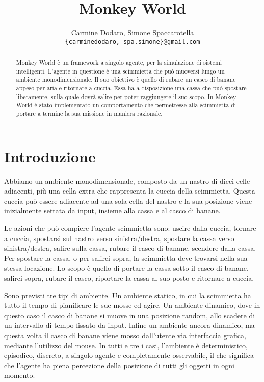 \documentclass[a4paper,10pt]{article}
\title{Monkey World}
\author{
    Carmine Dodaro, Simone Spaccarotella \\
    \texttt{\{carminedodaro, spa.simone\}@gmail.com}
}
\begin{document}
    \maketitle

    \begin{abstract}
	Monkey World è un framework a singolo agente, per la simulazione di sistemi intelligenti. L'agente
	in questione è una scimmietta che può muoversi lungo un ambiente monodimensionale. Il suo obiettivo è quello di rubare un
	casco di banane appeso per aria e ritornare a cuccia. Essa ha a disposizione una cassa che può spostare liberamente, sulla quale dovrà salire per poter
	raggiungere il suo scopo. In Monkey World è stato implementato un comportamento che permettesse alla scimmietta di portare a termine
	la sua missione in maniera razionale.
    \end{abstract}

    \section{Introduzione}
	Abbiamo un ambiente monodimensionale, composto da un nastro di dieci celle adiacenti, più una cella extra che
	rappresenta la cuccia della scimmietta. Questa cuccia può essere adiacente ad una sola cella del nastro e la sua
	posizione viene inizialmente settata da input, insieme alla cassa e al casco di banane.
	
	Le azioni che può compiere l'agente scimmietta sono: uscire dalla cuccia, tornare a cuccia,
	spostarsi sul nastro verso sinistra/destra, spostare la cassa verso sinistra/destra, salire sulla cassa,
	rubare il casco di banane, scendere dalla cassa. Per spostare la cassa, o per salirci sopra, la scimmietta deve trovarsi
	nella sua stessa locazione. Lo scopo è quello di portare la cassa sotto il casco di banane, salirci sopra, rubare il casco, 
	riportare la cassa al suo posto e ritornare a cuccia.
	
	Sono previsti tre tipi di ambiente. Un ambiente statico, in cui la scimmietta ha tutto il tempo di pianificare le sue mosse
	ed agire. Un ambiente dinamico, dove in questo caso il casco di banane si muove in una posizione random, allo scadere di un intervallo di tempo fissato
	da input. Infine un ambiente ancora dinamico, ma questa volta il casco di banane viene mosso dall'utente via interfaccia grafica, mediante
	l'utilizzo del mouse. In tutti e tre i casi, l'ambiente è deterministico, episodico, discreto, a singolo agente e completamente osservabile,
	il che significa che l'agente ha piena percezione della posizione di tutti gli oggetti in ogni momento.
	
\end{document}
